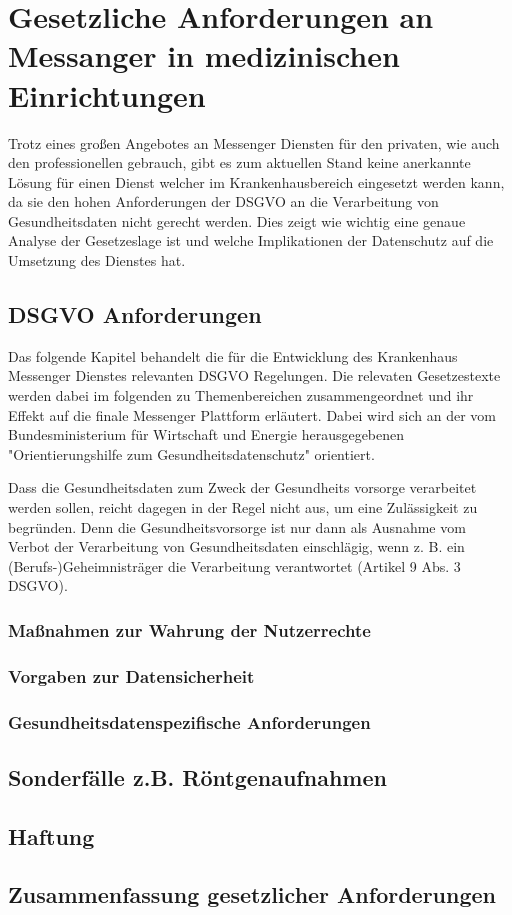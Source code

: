 \chapter{Gesetzliche Anforderungen an Messanger in medizinischen Einrichtungen}\label{chapter:ganforderungen}
Trotz eines großen Angebotes an Messenger Diensten für den privaten, wie auch den professionellen gebrauch, gibt es zum aktuellen Stand keine anerkannte Lösung für einen Dienst welcher im Krankenhausbereich eingesetzt werden kann, da sie den hohen Anforderungen der DSGVO an die Verarbeitung von Gesundheitsdaten nicht gerecht werden. Dies zeigt wie wichtig eine genaue Analyse der Gesetzeslage ist und welche Implikationen der Datenschutz auf die Umsetzung des Dienstes hat.

\section{DSGVO Anforderungen}\label{section:dsgvo}
Das folgende Kapitel behandelt die für die Entwicklung des Krankenhaus Messenger Dienstes relevanten DSGVO Regelungen. Die relevaten Gesetzestexte werden dabei im folgenden zu Themenbereichen zusammengeordnet und ihr Effekt auf die finale Messenger Plattform erläutert. Dabei wird sich an der vom Bundesministerium für Wirtschaft und Energie herausgegebenen "Orientierungshilfe zum Gesundheitsdatenschutz" orientiert.

Dass die Gesundheitsdaten zum Zweck der Gesundheits vorsorge verarbeitet werden sollen, reicht dagegen in der Regel nicht aus, um eine Zulässigkeit zu begründen. Denn die Gesundheitsvorsorge ist nur dann als Ausnahme vom Verbot der Verarbeitung von Gesundheitsdaten einschlägig, wenn z. B. ein (Berufs-)Geheimnisträger die Verarbeitung verantwortet (Artikel 9 Abs. 3 DSGVO).

\subsection{Maßnahmen zur Wahrung der Nutzerrechte}\label{subsection:mzwdn}

\subsection{Vorgaben zur Datensicherheit}\label{subsection:mzwdn}

\subsection{Gesundheitsdatenspezifische Anforderungen}\label{subsection:ga}

\section{Sonderfälle z.B. Röntgenaufnahmen}\label{section:sr}

\section{Haftung}\label{section:haftung}

\section{Zusammenfassung gesetzlicher Anforderungen}\label{section:zga}

